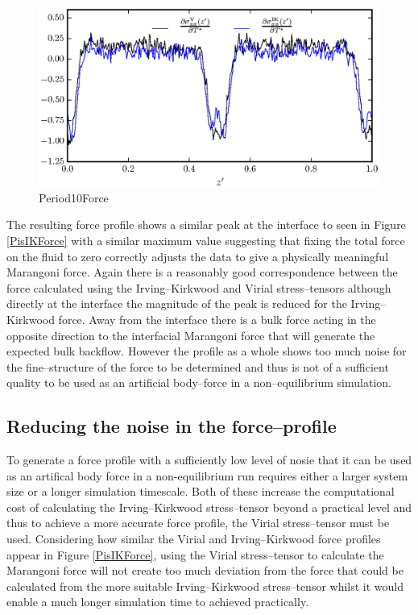 \begin{figure}[h]
\centering
\includegraphics[scale=0.8]{Period10Force}
\caption{Period10Force}
\label{Period10Force}
\end{figure}
The resulting force profile shows a similar peak at the interface to seen in Figure \ref{PisIKForce} with a similar maximum value suggesting that fixing the total force on the fluid to zero correctly adjusts the data to give a physically meaningful Marangoni force.
Again there is a reasonably good correspondence between the force calculated using the Irving--Kirkwood and Virial stress--tensors although directly at the interface the magnitude of the peak is reduced for the Irving--Kirkwood force.
Away from the interface there is a bulk force acting in the opposite direction to the interfacial Marangoni force that will generate the expected bulk backflow.
However the profile as a whole shows too much noise for the fine--structure of the force to be determined and thus is not of a sufficient quality to be used as an artificial body--force in a non--equilibrium simulation.

\subsection{Reducing the noise in the force--profile}
To generate a force profile with a sufficiently low level of nosie that it can be used as an artifical body force in a non-equilibrium run requires either a larger system size or a longer simulation timescale.
Both of these increase the computational cost of calculating the Irving--Kirkwood stress--tensor beyond a practical level and thus to achieve a more accurate force profile, the Virial stress--tensor must be used.
Considering how similar the Virial and Irving--Kirkwood force profiles appear in Figure \ref{PisIKForce}, using the Virial stress--tensor to calculate the Marangoni force will not create too much deviation from the force that could be calculated from the more suitable Irving--Kirkwood stress--tensor whilst it would enable a much longer simulation time to achieved practically.
\FloatBarrier

